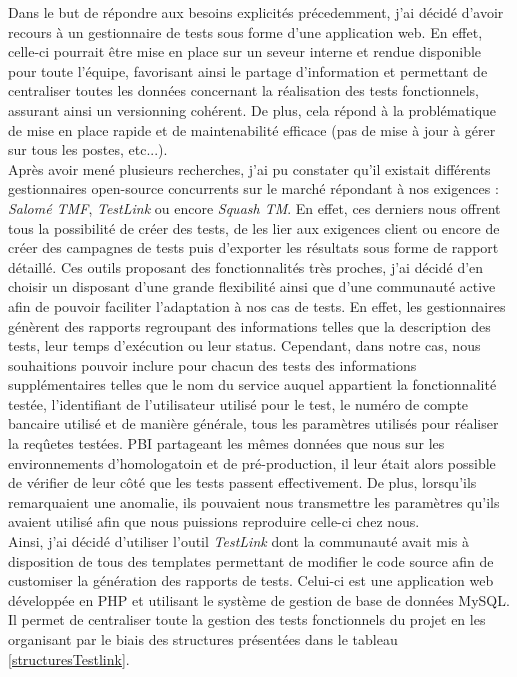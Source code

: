 	Dans le but de répondre aux besoins explicités précedemment, j'ai décidé d'avoir recours à un gestionnaire de tests sous forme d'une application web. En effet, celle-ci pourrait être mise en place sur un seveur interne et rendue disponible pour toute l'équipe, favorisant ainsi le partage d'information et permettant de centraliser toutes les données concernant la réalisation des tests fonctionnels, assurant ainsi un versionning cohérent. De plus, cela répond à la problématique de mise en place rapide et de maintenabilité efficace (pas de mise à jour à gérer sur tous les postes, etc...). \\
	
	Après avoir mené plusieurs recherches, j'ai pu constater qu'il existait différents gestionnaires open-source concurrents sur le marché répondant à nos exigences : \textit{Salomé TMF}, \textit{TestLink} ou encore \textit{Squash TM}. En effet, ces derniers nous offrent tous la possibilité de créer des tests, de les lier aux exigences client ou encore de créer des campagnes de tests puis d'exporter les résultats sous forme de rapport détaillé. Ces outils proposant des fonctionnalités très proches, j'ai décidé d'en choisir un disposant d'une grande flexibilité ainsi que d'une communauté active afin de pouvoir faciliter l'adaptation à nos cas de tests. En effet, les gestionnaires génèrent des rapports regroupant des informations telles que la description des tests, leur temps d'exécution ou leur status. Cependant, dans notre cas, nous souhaitions pouvoir inclure pour chacun des tests des informations supplémentaires telles que le nom du service auquel appartient la fonctionnalité testée, l'identifiant de l'utilisateur utilisé pour le test, le numéro de compte bancaire utilisé et de manière générale, tous les paramètres utilisés pour réaliser la reqûetes testées. PBI partageant les mêmes données que nous sur les environnements d'homologatoin et de pré-production, il leur était alors possible de vérifier de leur côté que les tests passent effectivement. De plus, lorsqu'ils remarquaient une anomalie, ils pouvaient nous transmettre les paramètres qu'ils avaient utilisé afin que nous puissions reproduire celle-ci chez nous. \\
	
	Ainsi, j'ai décidé d'utiliser l'outil \textit{TestLink} dont la communauté avait mis à disposition de tous des templates permettant de modifier le code source afin de customiser la génération des rapports de tests. Celui-ci est une application web développée en PHP et utilisant le système de gestion de base de données MySQL. Il permet de centraliser toute la gestion des tests fonctionnels du projet en les organisant par le biais des structures présentées dans le tableau \ref{structuresTestlink}.

